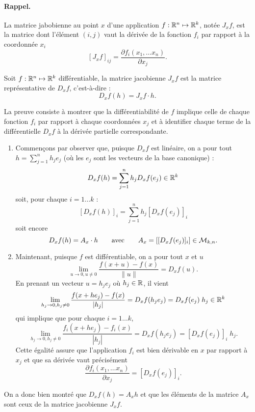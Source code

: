 \paragraph{Rappel.} La matrice jabobienne au point $x$ d'une application $f : \mathbb{R}^n \mapsto \mathbb{R}^k$, notée $J_xf$, est la matrice dont l'élément $(i, j)$ vaut la dérivée de la fonction $f_i$ par rapport à la coordonnée $x_i$
$$
[J_xf]_{ij} = \frac{\partial f_i(x_1, \dots x_n)}{\partial x_j}.
$$

\begin{proposition*}
  Soit $f : \mathbb{R}^n \mapsto \mathbb{R}^k$ différentiable, la matrice jacobienne $J_xf$ est la matrice représentative de $D_xf$, c'est-à-dire :
  $$
  D_xf(h) = J_xf \cdot h.
  $$
\end{proposition*}

\proof
La preuve consiste à montrer que la différentiabilité de $f$ implique celle de chaque fonction $f_i$ par rapport à chaque coordonnées $x_j$ et à identifier chaque terme de la différentielle $D_xf$ à la dérivée partielle correspondante. 
\begin{enumerate}
  \item Commençons par observer que, puisque $D_x f$ est linéaire, on a pour tout $h = \sum_{j=1}^n h_j e_j$ (où les $e_j$ sont les vecteurs de la base canonique) :
  $$
  D_xf(h) = \sum_{j=1}^n h_j D_xf(e_j) \in \mathbb{R}^k
  $$
  soit, pour chaque $i = 1 \dots k$ :
  $$
  [D_xf(h)]_i = \sum_{j=1}^n h_j [D_xf(e_j)]_i
  $$
  soit encore
  $$
  D_xf(h) = A_x \cdot h
  \qquad \text{avec} \qquad
  A_x = \left[ [D_xf(e_j)]_i \right] \in \mathcal{M}_{k, n}.
  $$
  \item Maintenant, puisque $f$ est différentiable, on a pour tout $x$ et $u$
  $$
  \lim_{u\rightarrow 0, u \neq 0} \frac{f(x+u) - f(x)}{\|u\|} = D_xf(u).
  $$
  En prenant un vecteur $u = h_j e_j$ où $h_j \in \mathbb{R}$, il vient
  $$
  \lim_{h_j\rightarrow 0, h_j \neq 0} \frac{f(x+h e_j) - f(x)}{|h_j|} = D_xf(h_j e_j)  =  D_xf(e_j) \; h_j \in \mathbb{R}^k
  $$
  qui implique que pour chaque $i = 1 \dots k$, 
  $$
  \lim_{h_j\rightarrow 0, h_j \neq 0} \frac{f_i(x+h e_j) - f_i(x)}{|h_j|} = D_xf(h_j e_j)  = [D_xf(e_j)]_i \; h_j.
  $$
  Cette égalité assure que l'application $f_i$ est bien dérivable en $x$ par rapport à $x_j$ et que sa dérivée vaut précisément
  $$
  \frac{\partial f_i(x_1, \dots x_n)}{\partial x_j} = [D_xf(e_j)]_i.
  $$
\end{enumerate}
On a donc bien montré que $D_xf(h) = A_x h$ et que les éléments de la matrice $A_x$ sont ceux de la matrice jacobienne $J_xf$.
\eproof

